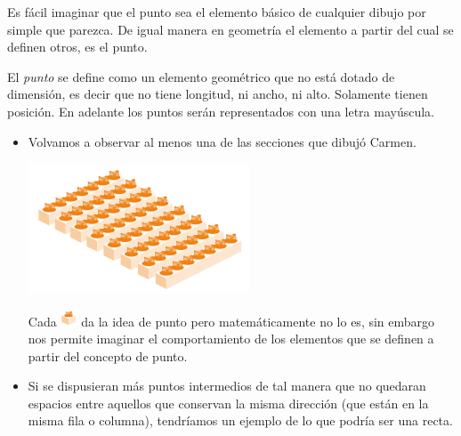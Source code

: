 \documentclass[10pt,twoside]{article}
\begin{document}
Es fácil imaginar que el punto sea el elemento básico de cualquier dibujo por simple que parezca. De igual manera en geometría el elemento a partir del cual se definen otros, es el punto.

El \emph{punto} se define como un elemento geométrico que no está dotado de dimensión, es decir que no tiene longitud, ni ancho, ni alto. Solamente tienen posición. En adelante los puntos serán representados con una letra mayúscula.
\begin{itemize}
\item Volvamos a observar al menos una de las secciones que dibujó Carmen.

\begin{minipage}{.35\textwidth}
\includegraphics[scale=.45]{Images/CultivHidrop02.png} 
\end{minipage}\hfill
\begin{minipage}{.6\textwidth}
Cada \includegraphics[height=14pt]{Images/CultivHidrop03.png}  da la idea de punto pero matemáticamente no lo es, sin embargo nos permite imaginar el comportamiento de los elementos que se definen a partir del concepto de punto.
\end{minipage}
\item Si se dispusieran más puntos intermedios de tal manera que no quedaran espacios entre aquellos que conservan la misma dirección (que están en la misma fila o columna), tendríamos un ejemplo de lo que podría ser una recta.
\end{itemize}
\end{document}
